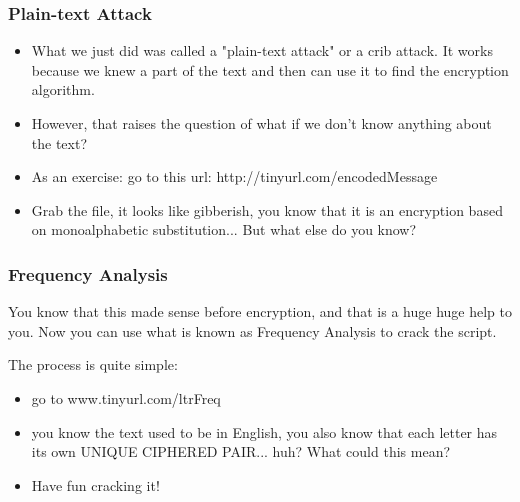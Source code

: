 \documentclass{beamer}
\begin{document}
\begin{frame}
    \frametitle{Plain-text Attack}
    \begin{itemize}
        \item What we just did was called a "plain-text attack" or a crib
            attack. It works because we knew a part of the text and then
            can use it to find the encryption algorithm.
        \item However, that raises the question of what if we don't know
            anything about the text?
        \item As an exercise: go to this url: http://tinyurl.com/encodedMessage
        \item Grab the file, it looks like gibberish, you know that it is an
            encryption based on monoalphabetic substitution... But what else do
            you know?
    \end{itemize}
\end{frame}

\begin{frame}
    \frametitle{Frequency Analysis}
    You know that this made sense before encryption, and that is a huge huge
    help to you. Now you can use what is known as Frequency Analysis to crack
    the script.

    The process is quite simple:
    \begin{itemize}
        \item go to www.tinyurl.com/ltrFreq
        \item you know the text used to be in English, you also know that each
            letter has its own UNIQUE CIPHERED PAIR... huh? What could this
            mean?
        \item Have fun cracking it!
    \end{itemize}
\end{frame}
\end{document}

